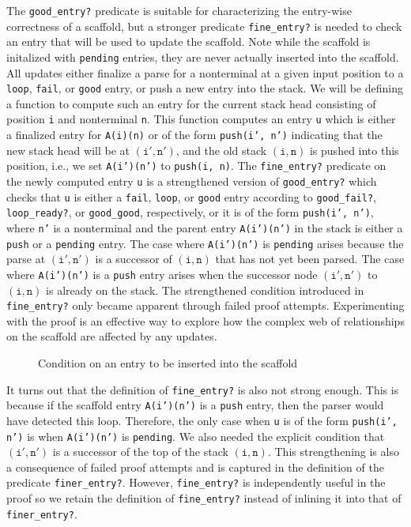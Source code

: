 \documentclass[sigplan,10pt,anonymous,review]{acmart}\settopmatter{printfolios=true,printccs=false,printacmref=false}
\begin{document}
\begin{CCSXML}
The \texttt{good\_entry?}  predicate is suitable for characterizing
the entry-wise correctness of a scaffold, but a
stronger predicate \texttt{fine\_entry?} is needed to check an entry that
will be used to update the scaffold.  Note while the scaffold is initalized
with \texttt{pending} entries, they are never actually inserted into the scaffold.  All updates either finalize
a parse for a nonterminal at a given input position to a \texttt{loop},
\texttt{fail}, or \texttt{good} entry, or push a new entry into the stack.
We will be defining a function to compute such an entry for the current stack head consisting of position \texttt{i} and nonterminal \texttt{n}\@.  This function
computes an entry \texttt{u} which is either a finalized entry for
\texttt{A(i)(n)} or of the form \texttt{push(i', n')}
indicating that the new stack head will be at $(\mathtt{i'}, \mathtt{n'})$, and
the old stack $(\mathtt{i}, \mathtt{n})$ is pushed into this position, i.e., we set
\texttt{A(i')(n')} to \texttt{push(i, n)}\@.  
The \texttt{fine\_entry?} predicate on the newly computed entry \texttt{u}
is a strengthened version of  \texttt{good\_entry?} which checks that 
\texttt{u} is either a \texttt{fail}, \texttt{loop}, or
\texttt{good} entry according to \texttt{good\_fail?}, \texttt{loop\_ready?}, or \texttt{good\_good}, respectively, or it is of the form \texttt{push(i', n')}, where
\texttt{n'} is a nonterminal and the parent entry \texttt{A(i')(n')} in the stack
is either a \texttt{push} or a \texttt{pending} entry.  The case where \texttt{A(i')(n')} is \texttt{pending} arises because the parse at $(\mathtt{i', n'})$ is a successor of $(\mathtt{i, n})$ that has not yet been parsed.  The case where
\texttt{A(i')(n')} is a \texttt{push} entry arises when the successor node $(\mathtt{i', n'})$ to $(\mathtt{i, n})$ is already on the stack.  
The strengthened condition introduced in \texttt{fine\_entry?}
only became apparent through failed proof attempts.  Experimenting with the proof is an effective way to explore how the complex web of relationships on the scaffold are affected by any updates.  

\begin{figure}[h!]
  
    \vspace*{-4mm}
\caption{Condition on an entry to be inserted into the scaffold}
\label{pvs:fineentry}
\end{figure}

It turns out that the definition of \texttt{fine\_entry?} is also not
strong enough.  This is because if the scaffold entry
\texttt{A(i')(n')} is a \texttt{push} entry, then the parser would
have detected this loop.  Therefore, the only case when \texttt{u} is
of the form \texttt{push(i', n')} is when \texttt{A(i')(n')} is
\texttt{pending}.  We also needed the explicit condition that
$(\mathtt{i', n'})$ is a successor of the top of the stack $(\mathtt{i,
  n})$\@.  This strengthening is also a consequence of failed proof
attempts and is captured in the definition of the predicate
\texttt{finer\_entry?}\@.  However, \texttt{fine\_entry?} is independently
useful in the proof so we retain the definition of \texttt{fine\_entry?}
instead of inlining it into that of \texttt{finer\_entry?}\@.  


\end{CCSXML}
\end{document}
